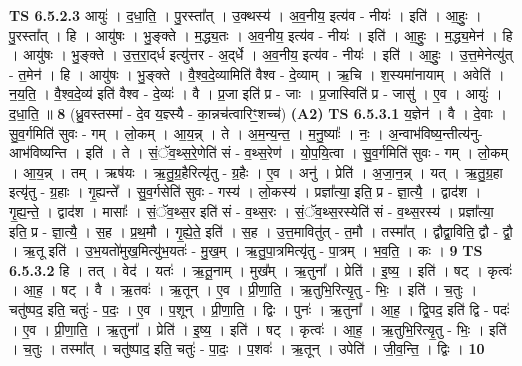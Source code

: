 \documentclass[17pt]{extarticle}
\begin{document}
                  \newline
                                \textbf{ TS 6.5.2.3} \newline
                  आयुः॑ । द॒धा॒ति॒ । पु॒रस्ता᳚त् । उ॒क्थस्य॑ । अ॒व॒नीय॒ इत्य॑व - नीयः॑ । इति॑ । आ॒हुः॒ । पु॒रस्ता᳚त् । हि । आयु॑षः । भु॒ङ्क्ते । म॒द्ध्य॒तः । अ॒व॒नीय॒ इत्य॑व - नीयः॑ । इति॑ । आ॒हुः॒ । म॒द्ध्य॒मेन॑ । हि । आयु॑षः । भु॒ङ्क्ते । उ॒त्त॒रा॒द्‌र्ध इत्यु॑त्तर - अ॒द्‌र्धे । अ॒व॒नीय॒ इत्य॑व - नीयः॑ । इति॑ । आ॒हुः॒ । उ॒त्त॒मेनेत्यु॑त् - त॒मेन॑ । हि । आयु॑षः । भु॒ङ्क्ते । वै॒श्व॒दे॒व्यामिति॑ वैश्व - दे॒व्याम् । ऋ॒चि । श॒स्यमा॑नायाम् । अवेति॑ । न॒य॒ति॒ । वै॒श्व॒दे॒व्य॑ इति॑ वैश्व - दे॒व्यः॑ । वै । प्र॒जा इति॑ प्र - जाः । प्र॒जास्विति॑ प्र - जासु॑ । ए॒व । आयुः॑ । द॒धा॒ति॒ ॥ \textbf{  8} \newline
                  \newline
                      (ध्रु॒वस्तस्मा॑ - दे॒व य॒ज्ञ्स्यै - का॒न्नच॑त्वारिꣳ॒॒शच्च॑)  \textbf{(A2)} \newline \newline
                                \textbf{ TS 6.5.3.1} \newline
                  य॒ज्ञेन॑ । वै । दे॒वाः । सु॒व॒र्गमिति॑ सुवः - गम् । लो॒कम् । आ॒य॒न्न् । ते । अ॒म॒न्य॒न्त॒ । म॒नु॒ष्याः᳚ । नः॒ । अ॒न्वाभ॑विष्य॒न्तीत्य॑नु-आभ॑विष्यन्ति । इति॑ । ते । सं॒ॅव॒थ्स॒रे॒णेति॑ सं - व॒थ्स॒रेण॑ । यो॒प॒यि॒त्वा । सु॒व॒र्गमिति॑ सुवः - गम् । लो॒कम् । आ॒य॒न्न् । तम् । ऋष॑यः । ऋ॒तु॒ग्र॒हैरित्यृ॑तु - ग्र॒हैः । ए॒व । अनु॑ । प्रेति॑ । अ॒जा॒न॒न्न् । यत् । ऋ॒तु॒ग्र॒हा इत्यृ॑तु - ग्र॒हाः । गृ॒ह्यन्ते᳚ । सु॒व॒र्गसेति॑ सुवः - गस्य॑ । लो॒कस्य॑ । प्रज्ञा᳚त्या॒ इति॒ प्र - ज्ञा॒त्यै॒ । द्वाद॑श । गृ॒ह्य॒न्ते॒ । द्वाद॑श । मासाः᳚ । सं॒ॅव॒थ्स॒र इति॑ सं - व॒थ्स॒रः । सं॒ॅव॒थ्स॒रस्येति॑ सं - व॒थ्स॒रस्य॑ । प्रज्ञा᳚त्या॒ इति॒ प्र - ज्ञा॒त्यै॒ । स॒ह । प्र॒थ॒मौ । गृ॒ह्ये॒ते॒ इति॑ । स॒ह । उ॒त्त॒मावितु॑त् - त॒मौ । तस्मा᳚त् । द्वौद्वा॒विति॒ द्वौ - द्वौ॒ । ऋ॒तू इति॑ । उ॒भ॒यतो॑मुख॒मित्यु॑भ॒यतः॑ - मु॒ख॒म् । ऋ॒तु॒पा॒त्रमित्यृ॑तु - पा॒त्रम् । भ॒व॒ति॒ । कः । \textbf{  9} \newline
                  \newline
                                \textbf{ TS 6.5.3.2} \newline
                  हि । तत् । वेद॑ । यतः॑ । ऋ॒तू॒नाम् । मुख᳚म् । ऋ॒तुना᳚ । प्रेति॑ । इ॒ष्य॒ । इति॑ । षट् । कृत्वः॑ । आ॒ह॒ । षट् । वै । ऋ॒तवः॑ । ऋ॒तून् । ए॒व । प्री॒णा॒ति॒ । ऋ॒तुभि॒रित्यृ॒तु - भिः॒ । इति॑ । च॒तुः । चतु॑ष्पद॒ इति॒ चतुः॑ - प॒दः॒ । ए॒व । प॒शून् । प्री॒णा॒ति॒ । द्विः । पुनः॑ । ऋ॒तुना᳚ । आ॒ह॒ । द्वि॒पद॒ इति॑ द्वि - पदः॑ । ए॒व । प्री॒णा॒ति॒ । ऋ॒तुना᳚ । प्रेति॑ । इ॒ष्य॒ । इति॑ । षट् । कृत्वः॑ । आ॒ह॒ । ऋ॒तुभि॒रित्यृ॒तु - भिः॒ । इति॑ । च॒तुः । तस्मा᳚त् । चतु॑ष्पाद॒ इति॒ चतुः॑ - पा॒दः॒ । प॒शवः॑ । ऋ॒तून् । उपेति॑ । जी॒व॒न्ति॒ । द्विः । \textbf{  10} \newline
\end{document}
